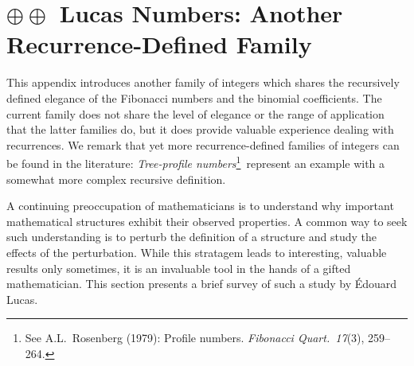 
\chapter{$\oplus \oplus$ Lucas Numbers: Another Recurrence-Defined Family}
\label{ch:recurrent-numbers-appendix}
\label{sec:Lucas-numbers}


\noindent
This appendix introduces another family of integers which shares the recursively defined elegance of the Fibonacci numbers and the binomial coefficients.  The current family does not share the level of elegance or the range of application that the latter families do, but it does provide valuable experience dealing with recurrences.  We remark that yet more recurrence-defined families of integers can be found in the literature: {\em Tree-profile numbers}\footnote{See A.L.~Rosenberg (1979): Profile numbers.  {\it Fibonacci Quart.~17}(3), 259--264.}~represent an example with a somewhat more complex recursive definition.




A continuing preoccupation of mathematicians is to understand why
important mathematical structures exhibit their observed properties.
A common way to seek such understanding is to perturb the definition
of a structure and study the effects of the perturbation.  While this
stratagem leads to interesting, valuable results only sometimes, it is
an invaluable tool in the hands of a gifted mathematician.  This
section presents a brief survey of such a study by \'{E}douard Lucas.  
 

